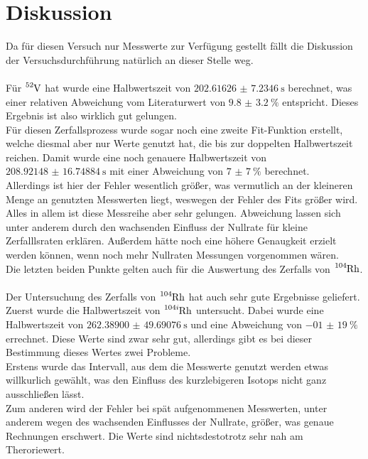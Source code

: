 \section{Diskussion}
Da für diesen Versuch nur Messwerte zur Verfügung gestellt fällt die Diskussion der Versuchsdurchführung natürlich an dieser Stelle weg.\\\\
Für $\ce{^{52}_{}V}$ hat wurde eine Halbwertszeit von $\SI{202.61626(723460)}{\second}$ berechnet, was einer relativen Abweichung vom Literaturwert von 
$\SI{9.8(32)}{\percent}$ entspricht. Dieses Ergebnis ist also wirklich gut gelungen.\\
Für diesen Zerfallsprozess wurde sogar noch eine zweite Fit-Funktion erstellt, welche diesmal aber nur Werte genutzt hat, die bis zur doppelten Halbwertszeit reichen.
Damit wurde eine noch genauere Halbwertszeit von $\SI{208.92148(1674884)}{\second}$ mit einer Abweichung von $\SI{7(7)}{\percent}$ berechnet.\\
Allerdings ist hier der Fehler wesentlich größer, was vermutlich an der kleineren Menge an genutzten Messwerten liegt, weswegen der Fehler des Fits größer wird.\\
Alles in allem ist diese Messreihe aber sehr gelungen. Abweichung lassen sich unter anderem durch den wachsenden Einfluss der Nullrate für kleine Zerfalllsraten erklären.
Außerdem hätte noch eine höhere Genaugkeit erzielt werden können, wenn noch mehr Nullraten Messungen vorgenommen wären.\\
Die letzten beiden Punkte gelten auch für die Auswertung des Zerfalls von $\ce{^{104}_{}Rh}$.\\\\
Der Untersuchung des Zerfalls von $\ce{^{104}_{}Rh}$ hat auch sehr gute Ergebnisse geliefert.\\
Zuerst wurde die Halbwertszeit von $\ce{^{104i}_{}Rh}$ untersucht. Dabei wurde eine Halbwertszeit von $\SI{262.38900(4969076)}{\second}$ und eine Abweichung von $\SI{-01(19)}{\percent}$ errechnet. 
Diese Werte sind zwar sehr gut, allerdings gibt es bei dieser Bestimmung dieses Wertes zwei Probleme.\\
Erstens wurde das Intervall, aus dem die Messwerte genutzt werden etwas willkurlich gewählt, was den Einfluss des kurzlebigeren Isotops nicht ganz ausschließen lässt.\\
Zum anderen wird der Fehler bei spät aufgenommenen Messwerten, unter anderem wegen des wachsenden Einflusses der Nullrate, größer, was genaue Rechnungen erschwert.
Die Werte sind nichtsdestotrotz sehr nah am Theroriewert.\\
